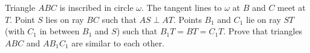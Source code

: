 Triangle $ ABC$ is inscribed in circle $ \omega$. The tangent lines to $ \omega$ at $ B$ and $ C$ meet at $ T$. Point $ S$ lies on ray $ BC$ such that $ AS \perp AT$. Points $ B_1$ and $ C_1$ lie on ray $ ST$ (with $ C_1$ in between $ B_1$ and $ S$) such that $ B_1T = BT = C_1T$. Prove that triangles $ ABC$ and $ AB_1C_1$ are similar to each other.